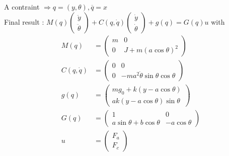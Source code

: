 A contraint $ \Rightarrow q = (y,\theta), \overline{q} = x$\\
Final result : 
$M(q) \left( \begin{array}{c}
\ddot{y}\\
\ddot{\theta}
\end{array} \right) + C(q,\dot{q}) \left( \begin{array}{c}
\dot{y}\\
\dot{\theta}
\end{array} \right) + g(q) = G(q) u$ with 
\begin{align*}
M(q) &=  \left( \begin{array}{cc}
m & 0\\
0 & J+m(a\cos\theta)^2
\end{array} \right)\\
C(q,\dot{q}) &= \left( \begin{array}{cc}
0 & 0\\
0 & -ma^2\dot{\theta}\sin\theta\cos\theta
\end{array} \right)\\
g(q) &= \left( \begin{array}{c}
mg_0 + k (y-a\cos\theta)\\
a k (y-a\cos\theta)\sin\theta
\end{array} \right)\\
G(q) &= \left( \begin{array}{cc}
1 & 0\\
a\sin\theta + b \cos\theta & -a\cos\theta
\end{array} \right)\\
u &= \left( \begin{array}{c}
F_a\\
F_c
\end{array} \right)
\end{align*}